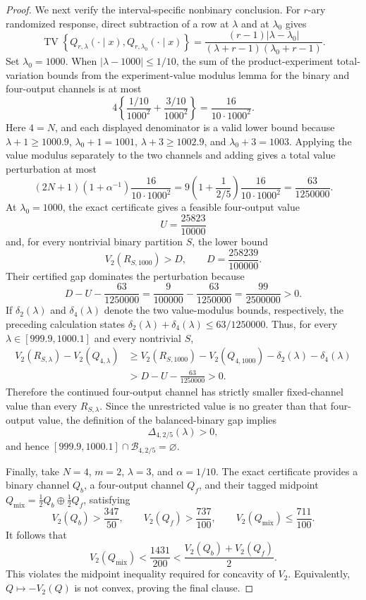\documentclass{article}
\begin{document}
\begin{proof}
We next verify the interval-specific nonbinary conclusion. For \(r\)-ary randomized response, direct subtraction of a row at \(\lambda\) and at \(\lambda_0\) gives
\[
 \operatorname{TV}\!\left\{Q_{r,\lambda}(\cdot\mid x),
 Q_{r,\lambda_0}(\cdot\mid x)\right\}
 =\frac{(r-1)|\lambda-\lambda_0|}
 {(\lambda+r-1)(\lambda_0+r-1)}.
\]
Set \(\lambda_0=1000\). When \(|\lambda-1000|\le1/10\), the sum of the product-experiment total-variation bounds from the experiment-value modulus lemma for the binary and four-output channels is at most
\[
 4\left\{
 \frac{1/10}{1000^2}+
 \frac{3/10}{1000^2}
 \right\}
 =\frac{16}{10\cdot1000^2}.
\]
Here \(4=N\), and each displayed denominator is a valid lower bound because \(\lambda+1\ge1000.9\), \(\lambda_0+1=1001\), \(\lambda+3\ge1002.9\), and \(\lambda_0+3=1003\). Applying the value modulus separately to the two channels and adding gives a total value perturbation at most
\[
 (2N+1)(1+\alpha^{-1})\frac{16}{10\cdot1000^2}
 =9\left(1+\frac{1}{2/5}\right)
   \frac{16}{10\cdot1000^2}
 =\frac{63}{1250000}.
\]
At \(\lambda_0=1000\), the exact certificate gives a feasible four-output value
\[
 U=\frac{25823}{10000}
\]
and, for every nontrivial binary partition \(S\), the lower bound
\[
 V_2(R_{S,1000})>D,
 \qquad D=\frac{258239}{100000}.
\]
Their certified gap dominates the perturbation because
\[
 D-U-\frac{63}{1250000}
 =\frac{9}{100000}-\frac{63}{1250000}
 =\frac{99}{2500000}>0.
\]
If \(\delta_2(\lambda)\) and \(\delta_4(\lambda)\) denote the two value-modulus bounds, respectively, the preceding calculation states \(\delta_2(\lambda)+\delta_4(\lambda)\le63/1250000\). Thus, for every \(\lambda\in[999.9,1000.1]\) and every nontrivial \(S\),
\[
\begin{aligned}
 V_2(R_{S,\lambda})-V_2(Q_{4,\lambda})
 &\ge V_2(R_{S,1000})-V_2(Q_{4,1000})
       -\delta_2(\lambda)-\delta_4(\lambda)\\
 &>D-U-\frac{63}{1250000}>0.
\end{aligned}
\]
Therefore the continued four-output channel has strictly smaller fixed-channel value than every \(R_{S,\lambda}\). Since the unrestricted value is no greater than that four-output value, the definition of the balanced-binary gap implies
\[
 \Delta_{4,2/5}(\lambda)>0,
\]
and hence \([999.9,1000.1]\cap\mathcal B_{4,2/5}=\varnothing\).

Finally, take \(N=4\), \(m=2\), \(\lambda=3\), and \(\alpha=1/10\). The exact certificate provides a binary channel \(Q_b\), a four-output channel \(Q_f\), and their tagged midpoint \(Q_{\mathrm{mix}}=\tfrac12Q_b\oplus\tfrac12Q_f\), satisfying
\[
 V_2(Q_b)>\frac{347}{50},
 \qquad
 V_2(Q_f)>\frac{737}{100},
 \qquad
 V_2(Q_{\mathrm{mix}})\le\frac{711}{100}.
\]
It follows that
\[
 V_2(Q_{\mathrm{mix}})
 <\frac{1431}{200}
 <\frac{V_2(Q_b)+V_2(Q_f)}2.
\]
This violates the midpoint inequality required for concavity of \(V_2\). Equivalently, \(Q\mapsto-V_2(Q)\) is not convex, proving the final clause.
\end{proof}
\end{document}

